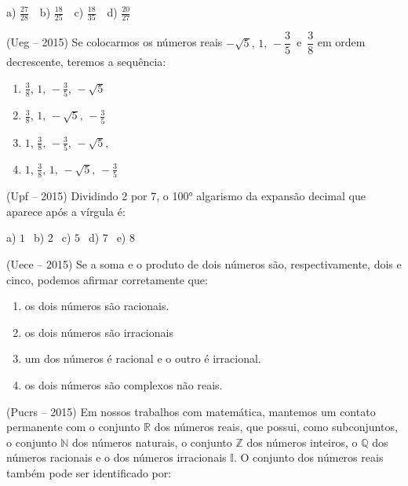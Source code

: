 \begin{multicols*}{2}
		      a) $\frac{27}{28} \ \ \ $ b) $\frac{18}{25} \ \ \ $ c) $\frac{18}{35} \ \ \ $ d) $\frac{20}{27}$

		\execnum (Ueg – 2015) Se colocarmos os números reais $ - \sqrt{5},\, 1,\, - \dfrac{3}{5}\, $ e $\, \dfrac{3}{8}$ em ordem decrescente, teremos a sequência:

		      \begin{enumerate}

			      \item $\frac{3}{8},\, 1,\,- \frac{3}{5},\, -\sqrt{5}$
			      \item $\frac{3}{8},\, 1,\,-\sqrt{5},\, - \frac{3}{5}$
			      \item $1,\, \frac{3}{8},\, - \frac{3}{5},\, -\sqrt{5},$
			      \item $1,\, \frac{3}{8},\, 1,\, -\sqrt{5},\, - \frac{3}{5}$

		      \end{enumerate}

		\execnum (Upf – 2015) Dividindo 2 por 7, o 100° algarismo da expansão decimal que aparece após a vírgula é:

		      a) $ 1 \ \ $ b) $ 2 \ \ $ c) $ 5 \ \ $ d) $ 7 \ \ $ e) $ 8 \ \ $

		\execnum (Uece – 2015) Se a soma e o produto de dois números são, respectivamente, dois e cinco, podemos afirmar corretamente que:

		      \begin{enumerate}

			      \item  os dois números são racionais.
			      \item  os dois números são irracionais
			      \item  um dos números é racional e o outro é irracional.
			      \item  os dois números são complexos não reais.

		      \end{enumerate}

		\execnum (Pucrs – 2015) Em nossos trabalhos com matemática, mantemos um contato permanente com o conjunto $ \mathbb{R} $ dos números reais, que possui, como subconjuntos, o conjunto $ \mathbb{N} $ dos números naturais, o conjunto $ \mathbb{Z} $ dos números inteiros, o $ \mathbb{Q} $ dos números racionais e o dos números irracionais $ \mathbb{I} $. O conjunto dos números reais também pode ser identificado por:

		      \begin{enumerate}


\end{enumerate}
\end{multicols*}
